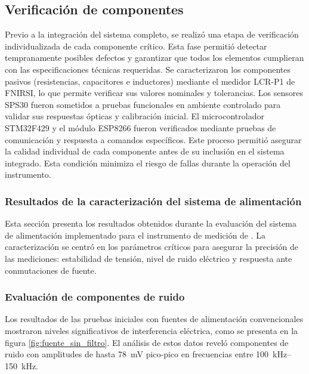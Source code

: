 \newpage
\subsection{Verificación de componentes}

Previo a la integración del sistema completo, se realizó una etapa de verificación individualizada de cada componente crítico. Esta fase permitió detectar tempranamente posibles defectos y garantizar que todos los elementos cumplieran con las especificaciones técnicas requeridas. Se caracterizaron los componentes pasivos (resistencias, capacitores e inductores) mediante el medidor LCR-P1 de FNIRSI, lo que permite verificar sus valores nominales y tolerancias. Los sensores SPS30 fueron sometidos a pruebas funcionales en ambiente controlado para validar sus respuestas ópticas y calibración inicial. El microcontrolador STM32F429 y el módulo ESP8266 fueron verificados mediante pruebas de comunicación y respuesta a comandos específicos. Este proceso permitió asegurar la calidad individual de cada componente antes de su inclusión en el sistema integrado. Esta condición minimiza el riesgo de fallas durante la operación del instrumento.

\subsubsection{Resultados de la caracterización del sistema de alimentación}

Esta sección presenta los resultados obtenidos durante la evaluación del sistema de alimentación implementado para el instrumento de medición de \MPF. La caracterización se centró en los parámetros críticos para asegurar la precisión de las mediciones: estabilidad de tensión, nivel de ruido eléctrico y respuesta ante conmutaciones de fuente.

\subsubsection{Evaluación de componentes de ruido}

Los resultados de las pruebas iniciales con fuentes de alimentación convencionales mostraron niveles significativos de interferencia eléctrica, como se presenta en la figura \ref{fig:fuente_sin_filtro}. El análisis de estos datos reveló componentes de ruido con amplitudes de hasta \SI{78}{\milli\volt} pico-pico en frecuencias entre \SIrange{100}{150}{\kilo\hertz}.

